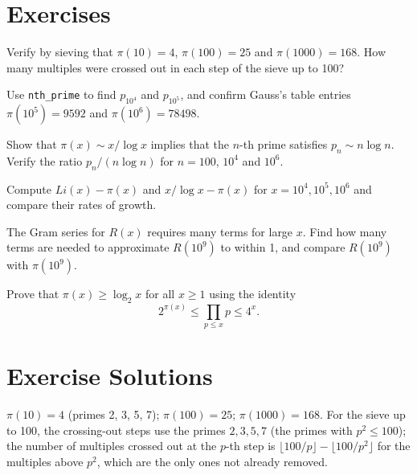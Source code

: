 \section{Exercises}

\begin{exercise}
Verify by sieving that $\pi(10) = 4$, $\pi(100) = 25$ and $\pi(1000) = 168$. How many multiples were crossed out in each step of the sieve up to 100?
\end{exercise}

\begin{exercise}
Use \texttt{nth\_prime} to find $p_{10^4}$ and $p_{10^5}$, and confirm Gauss's table entries $\pi(10^5) = 9592$ and $\pi(10^6) = 78498$.
\end{exercise}

\begin{exercise}
Show that $\pi(x) \sim x/\log x$ implies that the $n$-th prime satisfies $p_n \sim n \log n$. Verify the ratio $p_n/(n \log n)$ for $n = 100$, $10^4$ and $10^6$.
\end{exercise}

\begin{exercise}
Compute $Li(x) - \pi(x)$ and $x/\log x - \pi(x)$ for $x = 10^4, 10^5, 10^6$ and compare their rates of growth.
\end{exercise}

\begin{exercise}
The Gram series for $R(x)$ requires many terms for large $x$. Find how many terms are needed to approximate $R(10^9)$ to within 1, and compare $R(10^9)$ with $\pi(10^9)$.
\end{exercise}

\begin{exercise}
Prove that $\pi(x) \ge \log_2 x$ for all $x \ge 1$ using the identity
\[
2^{\pi(x)} \le \prod_{p \le x} p \le 4^x.
\]
\end{exercise}

\section{Exercise Solutions}

\begin{solution}
$\pi(10) = 4$ (primes 2, 3, 5, 7); $\pi(100) = 25$; $\pi(1000) = 168$. For the sieve up to 100, the crossing-out steps use the primes $2, 3, 5, 7$ (the primes with $p^2 \le 100$); the number of multiples crossed out at the $p$-th step is $\lfloor 100/p \rfloor - \lfloor 100/p^2 \rfloor$ for the multiples above $p^2$, which are the only ones not already removed.
\end{solution}

